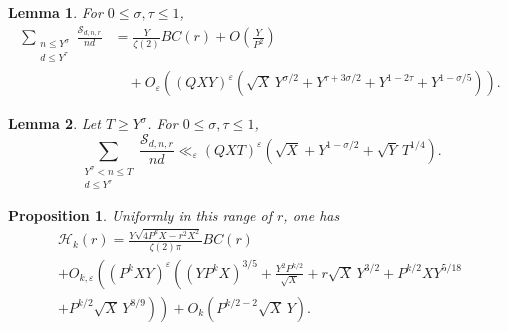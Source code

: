 \documentclass[10pt,a4paper]{amsart}
\newtheorem{lemma}{Lemma}
\newtheorem{proposition}{Proposition}
\begin{document}
\begin{lemma}\label{lem:small-n}
For $0\leq\sigma,\tau\leq1$,
\begin{equation*}
\begin{aligned}
\sum_{\substack{n\leq Y^\sigma\\d\leq Y^\tau}}
\frac{\mathcal S_{d,n,r}}{nd}
&=
\frac{Y}{\zeta(2)}BC(r)
+O\left(\frac{Y}{P^2}\right)\\
&\quad+
O_\varepsilon\left(
(QXY)^\varepsilon
\left(
\sqrt X\,Y^{\sigma/2}
+Y^{\tau+3\sigma/2}
+Y^{1-2\tau}
+Y^{1-\sigma/5}
\right)
\right).
\end{aligned}
\end{equation*}
\end{lemma}

\begin{lemma}\label{lem:large-n}
Let $T\geq Y^\sigma$.  For $0\leq\sigma,\tau\leq1$,
\[
\sum_{\substack{Y^\sigma<n\leq T\\d\leq Y^\tau}}
\frac{\mathcal S_{d,n,r}}{nd}
\ll_\varepsilon
(QXT)^\varepsilon
\left(
\sqrt X+Y^{1-\sigma/2}+\sqrt Y\,T^{1/4}
\right).
\]
\end{lemma}

\begin{proposition}\label{prop:hyperbolic-one-r}
Uniformly in this range of $r$, one has
\begin{multline*}
\mathcal H_k(r)
=
\frac{Y\sqrt{4P^kX-r^2X^2}}{\zeta(2)\pi}BC(r)
\\
+
O_{k,\varepsilon}\left(
(P^kXY)^\varepsilon
\left(
(YP^kX)^{3/5}
+
\frac{Y^2P^{k/2}}{\sqrt X}
+
r\sqrt X\,Y^{3/2}
+
P^{k/2}XY^{5/18}
\right.\right.
\\ \left.\left.
+
P^{k/2}\sqrt X\,Y^{8/9}
\right)
\right)
+
O_k\left(P^{k/2-2}\sqrt X\,Y\right).
\end{multline*}
\end{proposition}
\end{document}
